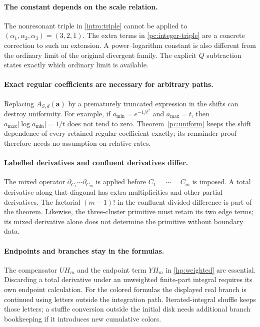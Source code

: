 \documentclass[11pt,a4paper]{article}
\theoremstyle{definition}
\theoremstyle{remark}
\numberwithin{equation}{section}
\begin{document}
\paragraph{The constant depends on the scale relation.}
The nonresonant triple in \eqref{intro:triple} cannot be applied to
$(\alpha_1,\alpha_2,\alpha_3)=(3,2,1)$.
The extra terms in \eqref{pc:integer-triple} are a concrete correction
to such an extension. A power--logarithm constant is also different
from the ordinary limit of the original divergent family. The
explicit $Q$ subtraction states exactly which ordinary limit is
available.

\paragraph{Exact regular coefficients are necessary for arbitrary paths.}
Replacing $A_{S,d}(\boldsymbol a)$ by a prematurely truncated expression
in the shifts can destroy uniformity. For example, if
$a_{\min}=e^{-1/t^2}$ and $a_{\max}=t$, then
$a_{\max}|\log a_{\min}|=1/t$ does not tend to zero.
Theorem~\ref{pc:uniform} keeps the shift dependence of every retained
regular coefficient exactly; its remainder proof therefore needs no
assumption on relative rates.

\paragraph{Labelled derivatives and confluent derivatives differ.}
The mixed operator $\partial_{C_1}\cdots\partial_{C_m}$ is applied
before $C_1=\cdots=C_m$ is imposed. A total derivative along that
diagonal has extra multiplicities and other partial derivatives.
The factorial $(m-1)!$ in the confluent divided difference is part
of the theorem. Likewise, the three-cluster primitive must retain
its two edge terms; its mixed derivative alone does not determine
the primitive without boundary data.

\paragraph{Endpoints and branches stay in the formulas.}
The compensator $UH_m$ and the endpoint term $YH_m$ in
\eqref{hp:weighted} are essential. Discarding a total derivative
under an unweighted finite-part integral requires its own endpoint
calculation. For the colored formulas the displayed real branch is
continued using letters outside the integration path. Iterated-integral
shuffle keeps those letters; a stuffle conversion outside the initial
disk needs additional branch bookkeeping if it introduces new
cumulative colors.
\end{document}
